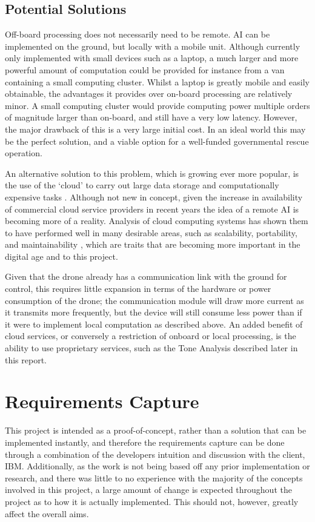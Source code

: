 \documentclass{article}
\begin{document}
\subsection{Potential Solutions}\label{PotentialSolutions}
Off-board processing does not necessarily need to be remote. AI can be implemented on the ground, but locally with a mobile unit. Although currently only implemented with small devices such as a laptop, a much larger and more powerful amount of computation could be provided for instance from a van containing a small computing cluster. Whilst a laptop is greatly mobile and easily obtainable, the advantages it provides over on-board processing are relatively minor. A small computing cluster would provide computing power multiple orders of magnitude larger than on-board, and still have a very low latency. However, the major drawback of this is a very large initial cost. In an ideal world this may be the perfect solution, and a viable option for a well-funded governmental rescue operation.

An alternative solution to this problem, which is growing ever more popular, is the use of the `cloud' to carry out large data storage and computationally expensive tasks \cite{CloudRobotics}. Although not new in concept, given the increase in availability of commercial cloud service providers in recent years the idea of a remote AI is becoming more of a reality. Analysis of cloud computing systems has shown them to have performed well in many desirable areas, such as scalability, portability, and maintainability \cite{SoftwareArchitecture}, which are traits that are becoming more important in the digital age and to this project. 

Given that the drone already has a communication link with the ground for control, this requires little expansion in terms of the hardware or power consumption of the drone; the communication module will draw more current as it transmits more frequently, but the device will still consume less power than if it were to implement local computation as described above. An added benefit of cloud services, or conversely a restriction of onboard or local processing, is the ability to use proprietary services, such as the Tone Analysis described later in this report.


\section{Requirements Capture}
This project is intended as a proof-of-concept, rather than a solution that can be implemented instantly, and therefore the requirements capture can be done through a combination of the developers intuition and discussion with the client, IBM. Additionally, as the work is not being based off any prior implementation or research, and there was little to no experience with the majority of the concepts involved in this project, a large amount of change is expected throughout the project as to how it is actually implemented. This should not, however, greatly affect the overall aims.
\end{document}
